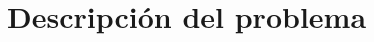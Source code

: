\documentclass[../proyecto.tex]{subfiles}
\begin{document}
\chapter{Descripción del problema}
\end{document}
